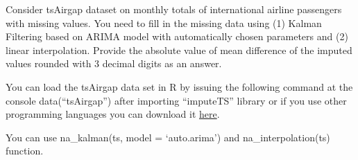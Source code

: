
\begin{question}
Consider tsAirgap dataset on monthly totals of international airline passengers with missing values. You need to fill in the missing data using (1) Kalman Filtering based on ARIMA model with automatically chosen parameters and (2) linear interpolation. Provide the absolute value of mean difference of the imputed values rounded with 3 decimal digits as an answer.

You can load the tsAirgap data set in R by issuing the following command at the console data(``tsAirgap'') after importing ``imputeTS'' library or if you use other programming languages you can download it \href{https://github.com/SteffenMoritz/imputeTS/blob/master/data/tsAirgap.rda}{here}.
\end{question}

\begin{solution}
You can use na\_kalman(ts, model = `auto.arima') and na\_interpolation(ts) function.
\end{solution}


